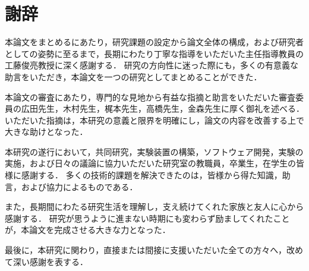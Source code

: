 \chapter*{謝辞}

本論文をまとめるにあたり，研究課題の設定から論文全体の構成，および研究者としての姿勢に至るまで，長期にわたり丁寧な指導をいただいた主任指導教員の工藤俊亮教授に深く感謝する．
研究の方向性に迷った際にも，多くの有意義な助言をいただき，本論文を一つの研究としてまとめることができた．

本論文の審査にあたり，専門的な見地から有益な指摘と助言をいただいた審査委員の広田先生，木村先生，梶本先生，高橋先生，金森先生に厚く御礼を述べる．
いただいた指摘は，本研究の意義と限界を明確にし，論文の内容を改善する上で大きな助けとなった．

本研究の遂行において，共同研究，実験装置の構築，ソフトウェア開発，実験の実施，および日々の議論に協力いただいた研究室の教職員，卒業生，在学生の皆様に感謝する．
多くの技術的課題を解決できたのは，皆様から得た知識，助言，および協力によるものである．

また，長期間にわたる研究生活を理解し，支え続けてくれた家族と友人に心から感謝する．
研究が思うように進まない時期にも変わらず励ましてくれたことが，本論文を完成させる大きな力となった．

最後に，本研究に関わり，直接または間接に支援いただいた全ての方々へ，改めて深い感謝を表する．